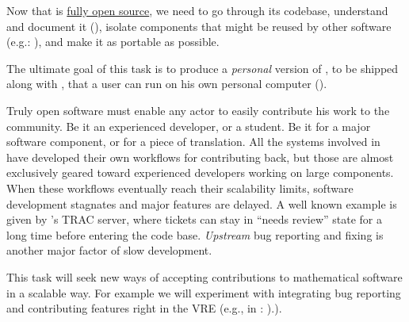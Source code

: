 \begin{workpackage}[id=component-architecture,wphases=0-48!.5,
  title=Component Architecture,lead=UV,
  PSRM=24,UVRM=8,SARM=16, USHRM=4]
\begin{tasklist}
\begin{task}[title=Document and modularize \SMC's codebase,id=extract-smc,lead=PS,PM=10]
    Now that \SMC is
    \href{https://twitter.com/sagemath/status/544939872294014977}{fully
      open source}, we need to go through its codebase, understand and
    document it
    (), isolate
    components that might be reused by other software (e.g.:
    \Jupyter), and make it as portable as possible.

    The ultimate goal of this task is to produce a \emph{personal}
    version of \SMC, to be shipped along with \Sage, that a user can
    run on his own personal computer
    ().
  \end{task}

  \begin{task}[title=Improving the development workflow in mathematical software,lead=UV,PM=4]
    Truly open software must enable any actor to easily contribute his
    work to the community. Be it an experienced developer, or a
    student. Be it for a major software component, or for a piece of
    translation. All the systems involved in \TheProject have
    developed their own workflows for contributing back, but those are
    almost exclusively geared toward experienced developers working on
    large components. When these workflows eventually reach their
    scalability limits, software development stagnates and major
    features are delayed. A well known example is given by \Sage's TRAC
    server, where tickets can stay in ``needs review'' state for a
    long time before entering the code base.  \emph{Upstream} bug
    reporting and fixing is another major factor of slow development.

    This task will seek new ways of accepting contributions to
    mathematical software in a scalable way. For example we will
    experiment with integrating bug reporting and contributing
    features right in the VRE (e.g., in \SMC:
    ).).


  \end{task}
\end{tasklist}


\end{workpackage}
